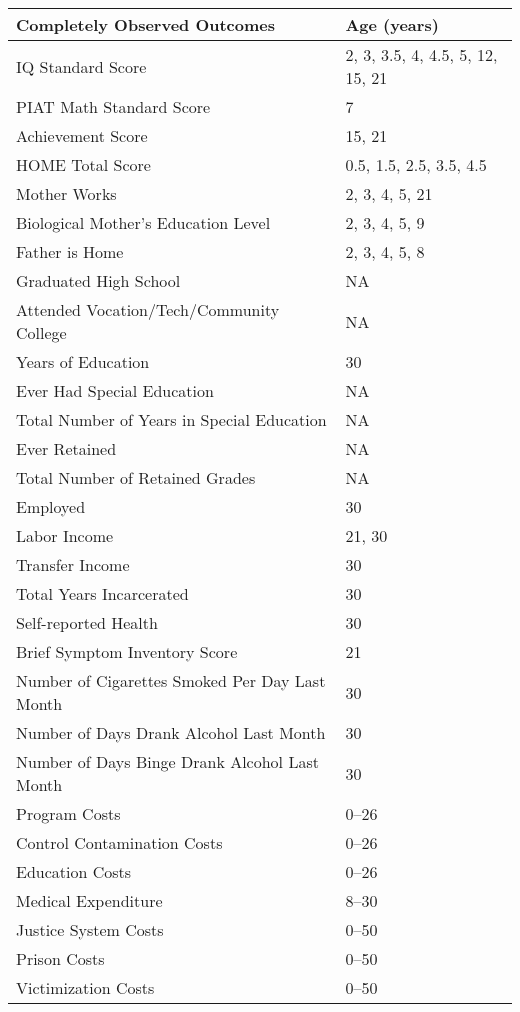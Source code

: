 \begin{tabular}{l l}
\toprule
Completely Observed Outcomes	&	Age (years) \\
\midrule			
IQ Standard Score	&			2, 3, 3.5, 4, 4.5, 5, 12, 15, 21	\\
PIAT Math Standard Score	&	7	\\
Achievement Score & 			15, 21 \\
HOME Total Score	&			0.5, 1.5, 2.5, 3.5, 4.5	\\
Mother Works	&				2, 3, 4, 5, 21	\\
Biological Mother's Education Level	&	2, 3, 4, 5, 9	\\
Father is Home	&				2, 3, 4, 5, 8	\\
Graduated High School	&		NA	\\
Attended Vocation/Tech/Community College	&	NA	\\
Years of Education	&	30	\\
Ever Had Special Education 			& NA \\
Total Number of Years in Special Education 	& NA \\
Ever Retained						& NA \\
Total Number of Retained Grades			& NA \\
Employed	&	30	\\
Labor Income &  21, 30 \\
Transfer Income &  30 \\
Total Years Incarcerated	&	30	\\
Self-reported Health	&	30	\\
Brief Symptom Inventory Score & 21 \\
Number of Cigarettes Smoked Per Day Last Month	&	30	\\
Number of Days Drank Alcohol Last Month	&	30	\\
Number of Days Binge Drank Alcohol Last Month	&	30	\\
Program Costs	&	0--26	\\
Control Contamination Costs	&	0--26	\\
Education Costs	&	0--26	\\
Medical Expenditure &	8--30	\\
Justice System Costs	&	0--50	\\
Prison Costs	&	0--50	\\
Victimization Costs	&	0--50	\\
\bottomrule			
\end{tabular}